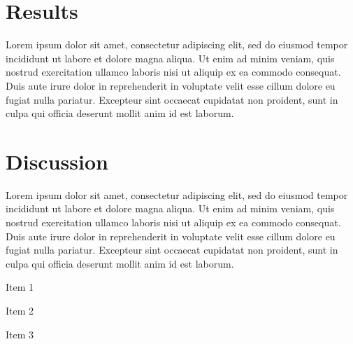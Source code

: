 \documentclass[nogrid]{MBE}%
\begin{document}
\section{{Results}\label{sec:Results}}

Lorem ipsum dolor sit amet, consectetur adipiscing elit, sed do eiusmod tempor incididunt ut labore et dolore magna aliqua. Ut enim ad minim veniam, quis nostrud exercitation ullamco laboris nisi ut aliquip ex ea commodo consequat. Duis aute irure dolor in reprehenderit in voluptate velit esse cillum dolore eu fugiat nulla pariatur. Excepteur sint occaecat cupidatat non proident, sunt in culpa qui officia deserunt mollit anim id est laborum.

\section{{Discussion}\label{sec:Discussion}}

Lorem ipsum dolor sit amet, consectetur adipiscing elit, sed do eiusmod tempor incididunt ut labore et dolore magna aliqua. Ut enim ad minim veniam, quis nostrud exercitation ullamco laboris nisi ut aliquip ex ea commodo consequat. Duis aute irure dolor in reprehenderit in voluptate velit esse cillum dolore eu fugiat nulla pariatur. Excepteur sint occaecat cupidatat non proident, sunt in culpa qui officia deserunt mollit anim id est laborum.

\begin{arabiclist}
\item Item 1

\item Item 2

\item Item 3
\end{arabiclist}
\end{document}
